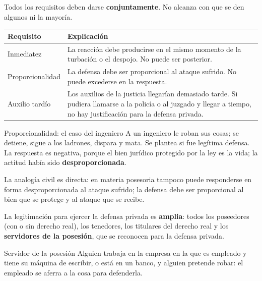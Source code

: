 \documentclass[12pt,oneside]{book}
\begin{document}
\begin{important}
Todos los requisitos deben darse \textbf{conjuntamente}. No alcanza con que se den algunos ni la mayoría.
\end{important}

\begin{table}[H]
\centering
\begin{tabularx}{\textwidth}{@{}>{\raggedright\arraybackslash}p{}>{\raggedright\arraybackslash}X@{}}
\toprule
\textbf{Requisito} & \textbf{Explicación} \\
\midrule
Inmediatez & La reacción debe producirse en el mismo momento de la turbación o el despojo. No puede ser posterior. \\
Proporcionalidad & La defensa debe ser proporcional al ataque sufrido. No puede excederse en la respuesta. \\
Auxilio tardío & Los auxilios de la justicia llegarían demasiado tarde. Si pudiera llamarse a la policía o al juzgado y llegar a tiempo, no hay justificación para la defensa privada. \\
\bottomrule
\end{tabularx}
\end{table}

\begin{example}{Proporcionalidad: el caso del ingeniero}
A un ingeniero le roban sus cosas; se detiene, sigue a los ladrones, dispara y mata. Se plantea si fue legítima defensa. La respuesta es negativa, porque el bien jurídico protegido por la ley es la vida; la actitud había sido \textbf{desproporcionada}.
\end{example}

La analogía civil es directa: en materia posesoria tampoco puede responderse en forma desproporcionada al ataque sufrido; la defensa debe ser proporcional al bien que se protege y al ataque que se recibe.

La legitimación para ejercer la defensa privada es \textbf{amplia}: todos los poseedores (con o sin derecho real), los tenedores, los titulares del derecho real y los \textbf{servidores de la posesión}, que se reconocen para la defensa privada.

\begin{example}{Servidor de la posesión}
Alguien trabaja en la empresa en la que es empleado y tiene su máquina de escribir, o está en un banco, y alguien pretende robar: el empleado se aferra a la cosa para defenderla.
\end{example}
\end{document}
